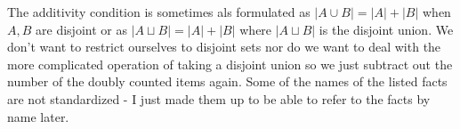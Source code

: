 \documentclass[12pt]{article}
\begin{document}
The additivity condition is sometimes als formulated as $|A \cup B| = |A| + |B|$ when $A,B$ are disjoint or as $|A \sqcup B| = |A| + |B|$ where $|A \sqcup B|$ is the disjoint union. We don't want to restrict ourselves to disjoint sets nor do we want to deal with the more complicated operation of taking a disjoint union so we just subtract out the number of the doubly counted items again. Some of the names of the listed facts are not standardized - I just made them up to be able to refer to the facts by name later.
\end{document}
